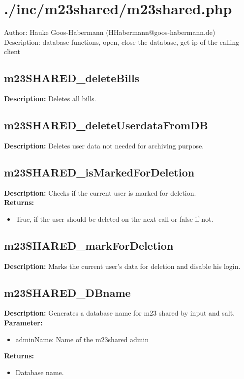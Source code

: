 \newpage\section{./inc/m23shared/m23shared.php}
 Author: Hauke Goos-Habermann (HHabermann@goos-habermann.de)\\
 Description: database functions, open, close the database, get ip of the calling client\\

\subsection{m23SHARED\_deleteBills}
\textbf{Description:} Deletes all bills.\\

\subsection{m23SHARED\_deleteUserdataFromDB}
\textbf{Description:} Deletes user data not needed for archiving purpose.\\

\subsection{m23SHARED\_isMarkedForDeletion}
\textbf{Description:} Checks if the current user is marked for deletion.\\
\textbf{Returns:}
\begin{itemize}
\item True, if the user should be deleted on the next call or false if not.
\end{itemize}

\subsection{m23SHARED\_markForDeletion}
\textbf{Description:} Marks the current user's data for deletion and disable his login.\\

\subsection{m23SHARED\_DBname}
\textbf{Description:} Generates a database name for m23 shared by input and salt.\\
\textbf{Parameter:}
\begin{itemize}
\item adminName: Name of the m23shared admin
\end{itemize}
\textbf{Returns:}
\begin{itemize}
\item Database name.
\end{itemize}

